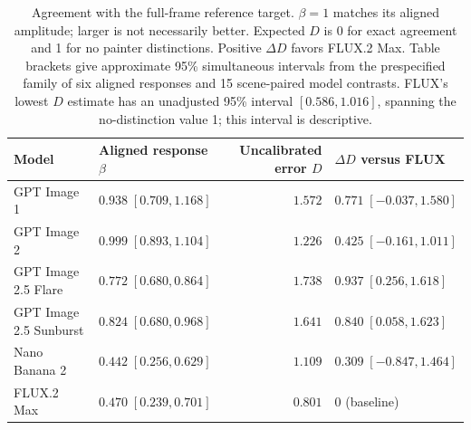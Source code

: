 \begin{table}[tbp]
\centering\small\setlength{\tabcolsep}{4pt}
\begin{tabularx}{\linewidth}{@{}>{\raggedright\arraybackslash}p{.24\linewidth}>{\raggedright\arraybackslash}Xr>{\raggedright\arraybackslash}X@{}}
\toprule
Model & Aligned response $\beta$ & \shortstack{Uncalibrated\\error $D$} & $\Delta D$ versus FLUX\\
\midrule
GPT Image 1 & $0.938\;[0.709,1.168]$ & $1.572$ & $0.771\;[-0.037,1.580]$\\[3pt]
GPT Image 2 & $0.999\;[0.893,1.104]$ & $1.226$ & $0.425\;[-0.161,1.011]$\\[3pt]
GPT Image 2.5 Flare & $0.772\;[0.680,0.864]$ & $1.738$ & $0.937\;[0.256,1.618]$\\[3pt]
GPT Image 2.5 Sunburst & $0.824\;[0.680,0.968]$ & $1.641$ & $0.840\;[0.058,1.623]$\\[3pt]
Nano Banana 2 & $0.442\;[0.256,0.629]$ & $1.109$ & $0.309\;[-0.847,1.464]$\\[3pt]
FLUX.2 Max & $0.470\;[0.239,0.701]$ & $0.801$ & $0$ (baseline)\\[3pt]
\bottomrule\end{tabularx}
\caption{Agreement with the full-frame reference target. $\beta=1$ matches its aligned amplitude; larger is not necessarily better. Expected $D$ is 0 for exact agreement and 1 for no painter distinctions. Positive $\Delta D$ favors FLUX.2 Max. Table brackets give approximate 95\% simultaneous intervals from the prespecified family of six aligned responses and 15 scene-paired model contrasts. FLUX's lowest $D$ estimate has an unadjusted 95\% interval $[0.586,1.016]$, spanning the no-distinction value 1; this interval is descriptive.}
\label{tab:specificity-models}\end{table}
